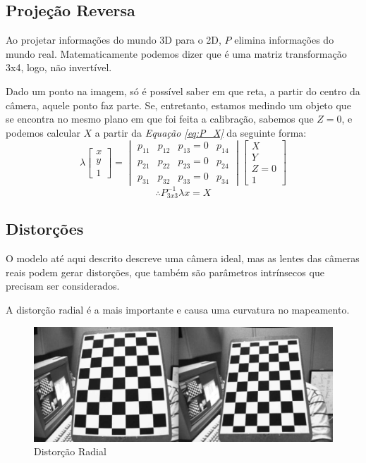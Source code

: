 \documentclass[conference]{IEEEtran}
\begin{document}
\subsection{Projeção Reversa}
Ao projetar informações do mundo 3D para o 2D, \(P\) elimina informações do mundo real. Matematicamente podemos dizer que é uma matriz transformação 3x4, logo, não invertível. 

Dado um ponto na imagem, só é possível saber em que reta, a partir do centro da câmera, aquele ponto faz parte. Se, entretanto, estamos medindo um objeto que se encontra no mesmo plano em que foi feita a calibração, sabemos que \(Z=0\), e podemos calcular \(X\) a partir da \textit{Equação \ref{eq:P_X}} da seguinte forma:
\begin{equation}
\lambda  \begin{bmatrix} 
x \\
y \\
1
\end{bmatrix}
=
\begin{vmatrix} 
p_{11} & p_{12} & p_{13}=0& p_{14} \\
p_{21} & p_{22} & p_{23}=0& p_{24} \\
p_{31} & p_{32} & p_{33}=0& p_{34} 
\end{vmatrix}
\begin{bmatrix} 
X \\
Y \\
Z=0 \\
1
\end{bmatrix}
\end{equation}
\begin{equation}
\therefore  P_{3x3}^{-1} \lambda x = X
\end{equation}
\subsection{Distorções}

O modelo até aqui descrito descreve uma câmera ideal, mas as lentes das câmeras reais podem gerar distorções, que também são parâmetros intrínsecos que precisam ser considerados. 

A distorção radial é a mais importante e causa uma curvatura no mapeamento.

\begin{figure}[ht!]
\begin{center}
\includegraphics[width=\columnwidth]{distortion.png}
\caption{Distorção Radial\cite{docsopencv}}
\end{center}
\end{figure}
\end{document}

